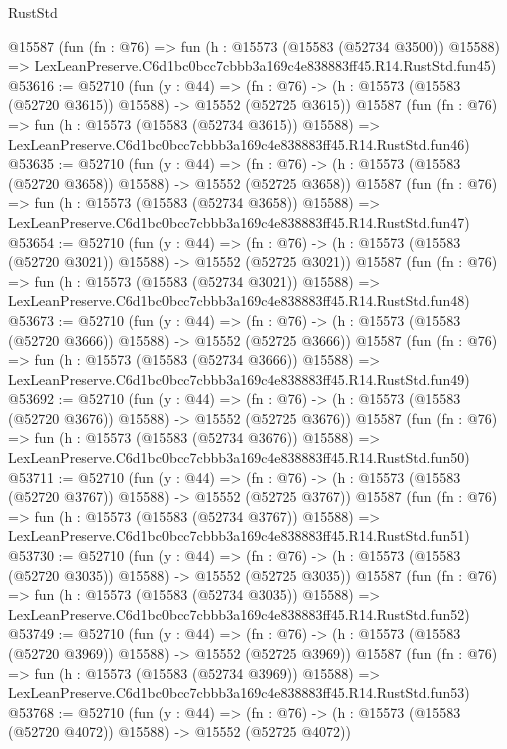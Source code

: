 \begin{lexlean}{RustStd}
\begin{coremodule}
    @15587
    (fun (fn : @76) =>
    fun (h : @15573 (@15583 (@52734 @3500)) @15588) =>
    LexLeanPreserve.C6d1bc0bcc7cbbb3a169c4e838883ff45.R14.RustStd.fun45)
@53616 := @52710
    (fun (y : @44) =>
    (fn : @76) -> (h : @15573 (@15583 (@52720 @3615)) @15588) -> @15552 (@52725 @3615))
    @15587
    (fun (fn : @76) =>
    fun (h : @15573 (@15583 (@52734 @3615)) @15588) =>
    LexLeanPreserve.C6d1bc0bcc7cbbb3a169c4e838883ff45.R14.RustStd.fun46)
@53635 := @52710
    (fun (y : @44) =>
    (fn : @76) -> (h : @15573 (@15583 (@52720 @3658)) @15588) -> @15552 (@52725 @3658))
    @15587
    (fun (fn : @76) =>
    fun (h : @15573 (@15583 (@52734 @3658)) @15588) =>
    LexLeanPreserve.C6d1bc0bcc7cbbb3a169c4e838883ff45.R14.RustStd.fun47)
@53654 := @52710
    (fun (y : @44) =>
    (fn : @76) -> (h : @15573 (@15583 (@52720 @3021)) @15588) -> @15552 (@52725 @3021))
    @15587
    (fun (fn : @76) =>
    fun (h : @15573 (@15583 (@52734 @3021)) @15588) =>
    LexLeanPreserve.C6d1bc0bcc7cbbb3a169c4e838883ff45.R14.RustStd.fun48)
@53673 := @52710
    (fun (y : @44) =>
    (fn : @76) -> (h : @15573 (@15583 (@52720 @3666)) @15588) -> @15552 (@52725 @3666))
    @15587
    (fun (fn : @76) =>
    fun (h : @15573 (@15583 (@52734 @3666)) @15588) =>
    LexLeanPreserve.C6d1bc0bcc7cbbb3a169c4e838883ff45.R14.RustStd.fun49)
@53692 := @52710
    (fun (y : @44) =>
    (fn : @76) -> (h : @15573 (@15583 (@52720 @3676)) @15588) -> @15552 (@52725 @3676))
    @15587
    (fun (fn : @76) =>
    fun (h : @15573 (@15583 (@52734 @3676)) @15588) =>
    LexLeanPreserve.C6d1bc0bcc7cbbb3a169c4e838883ff45.R14.RustStd.fun50)
@53711 := @52710
    (fun (y : @44) =>
    (fn : @76) -> (h : @15573 (@15583 (@52720 @3767)) @15588) -> @15552 (@52725 @3767))
    @15587
    (fun (fn : @76) =>
    fun (h : @15573 (@15583 (@52734 @3767)) @15588) =>
    LexLeanPreserve.C6d1bc0bcc7cbbb3a169c4e838883ff45.R14.RustStd.fun51)
@53730 := @52710
    (fun (y : @44) =>
    (fn : @76) -> (h : @15573 (@15583 (@52720 @3035)) @15588) -> @15552 (@52725 @3035))
    @15587
    (fun (fn : @76) =>
    fun (h : @15573 (@15583 (@52734 @3035)) @15588) =>
    LexLeanPreserve.C6d1bc0bcc7cbbb3a169c4e838883ff45.R14.RustStd.fun52)
@53749 := @52710
    (fun (y : @44) =>
    (fn : @76) -> (h : @15573 (@15583 (@52720 @3969)) @15588) -> @15552 (@52725 @3969))
    @15587
    (fun (fn : @76) =>
    fun (h : @15573 (@15583 (@52734 @3969)) @15588) =>
    LexLeanPreserve.C6d1bc0bcc7cbbb3a169c4e838883ff45.R14.RustStd.fun53)
@53768 := @52710
    (fun (y : @44) =>
    (fn : @76) -> (h : @15573 (@15583 (@52720 @4072)) @15588) -> @15552 (@52725 @4072))

\end{coremodule}
\end{lexlean}
